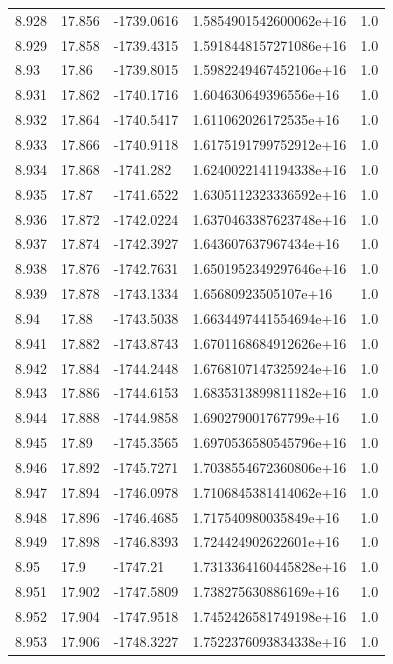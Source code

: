 \begin{tabular}{lllll}
8.928 & 17.856 & -1739.0616 & 1.5854901542600062e+16 & 1.0 \\
8.929 & 17.858 & -1739.4315 & 1.5918448157271086e+16 & 1.0 \\
8.93 & 17.86 & -1739.8015 & 1.5982249467452106e+16 & 1.0 \\
8.931 & 17.862 & -1740.1716 & 1.604630649396556e+16 & 1.0 \\
8.932 & 17.864 & -1740.5417 & 1.611062026172535e+16 & 1.0 \\
8.933 & 17.866 & -1740.9118 & 1.6175191799752912e+16 & 1.0 \\
8.934 & 17.868 & -1741.282 & 1.6240022141194338e+16 & 1.0 \\
8.935 & 17.87 & -1741.6522 & 1.6305112323336592e+16 & 1.0 \\
8.936 & 17.872 & -1742.0224 & 1.6370463387623748e+16 & 1.0 \\
8.937 & 17.874 & -1742.3927 & 1.643607637967434e+16 & 1.0 \\
8.938 & 17.876 & -1742.7631 & 1.6501952349297646e+16 & 1.0 \\
8.939 & 17.878 & -1743.1334 & 1.65680923505107e+16 & 1.0 \\
8.94 & 17.88 & -1743.5038 & 1.6634497441554694e+16 & 1.0 \\
8.941 & 17.882 & -1743.8743 & 1.6701168684912626e+16 & 1.0 \\
8.942 & 17.884 & -1744.2448 & 1.6768107147325924e+16 & 1.0 \\
8.943 & 17.886 & -1744.6153 & 1.6835313899811182e+16 & 1.0 \\
8.944 & 17.888 & -1744.9858 & 1.690279001767799e+16 & 1.0 \\
8.945 & 17.89 & -1745.3565 & 1.6970536580545796e+16 & 1.0 \\
8.946 & 17.892 & -1745.7271 & 1.7038554672360806e+16 & 1.0 \\
8.947 & 17.894 & -1746.0978 & 1.7106845381414062e+16 & 1.0 \\
8.948 & 17.896 & -1746.4685 & 1.717540980035849e+16 & 1.0 \\
8.949 & 17.898 & -1746.8393 & 1.724424902622601e+16 & 1.0 \\
8.95 & 17.9 & -1747.21 & 1.7313364160445828e+16 & 1.0 \\
8.951 & 17.902 & -1747.5809 & 1.738275630886169e+16 & 1.0 \\
8.952 & 17.904 & -1747.9518 & 1.7452426581749198e+16 & 1.0 \\
8.953 & 17.906 & -1748.3227 & 1.7522376093834338e+16 & 1.0 \\

\end{tabular}
